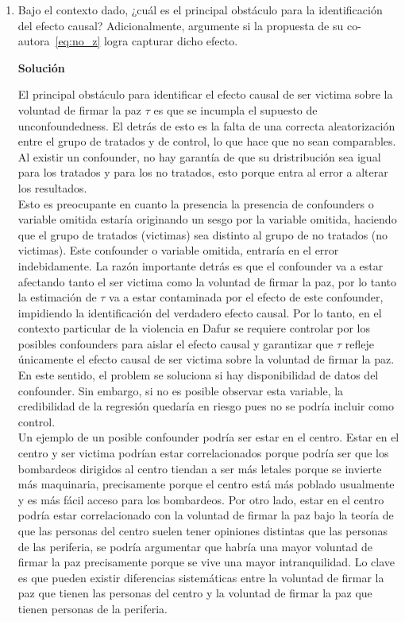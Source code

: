 \documentclass[a4paper, answers, addpoints, 11pt]{exam}
\newenvironment{solucion}{%
  \begin{mdframed}[
    backgroundcolor=blue!5,    %
    linecolor=blue!50,          %
    linewidth=2pt,              %
    leftmargin=10pt,            %
    rightmargin=10pt,           %
    topline=true,              %
    bottomline=true,            %
    roundcorner=10pt,           %
    innerleftmargin=10pt,       %
    innerrightmargin=10pt,      %
    innerbottommargin=10pt,     %
    innertopmargin=10pt         %
  ]%
  \begin{tcolorbox}[colframe=blue!50!black, colback=blue!50, coltitle=white, sharp corners=all, boxrule=1mm, width=\textwidth, halign=left, valign=center, top=0mm, bottom=0mm, left=0mm, right=0mm] \textbf{Solución} \end{tcolorbox} }{\end{mdframed}}
\begin{document}
\begin{enumerate}
    \item Bajo el contexto dado, ¿cuál es el principal obstáculo para la identificación del efecto causal? Adicionalmente, argumente si la propuesta de su co-autora~\eqref{eq:no_z} logra capturar dicho efecto.
    \begin{solucion}
        
        El principal obstáculo para identificar el efecto causal de ser victima sobre la voluntad de firmar la paz $\tau$ es que se incumpla el supuesto de unconfoundedness. El detrás de esto es la falta de una correcta aleatorización entre el grupo de tratados y de control, lo que hace que no sean comparables. Al existir un confounder, no hay garantía de que su dristribución sea igual para los tratados y para los no tratados, esto porque entra al error a alterar los resultados.\\
        
        
        Esto es preocupante en cuanto la presencia la presencia de confounders o variable omitida estaría originando un sesgo por la variable omitida, haciendo que el grupo de tratados (victimas) sea distinto al grupo de no tratados (no victimas). Este confounder o variable omitida, entraría en el error indebidamente. La razón importante detrás es que el confounder va a estar afectando tanto el ser victima como la voluntad de firmar la paz, por lo tanto la estimación de $\tau$ va a estar contaminada por el efecto de este confounder, impidiendo la identificación del verdadero efecto causal. Por lo tanto, en el contexto particular de la violencia en Dafur se requiere controlar por los posibles confounders para aislar el efecto causal y garantizar que $\tau$ refleje únicamente el efecto causal de ser victima sobre la voluntad de firmar la paz.  En este sentido, el problem se soluciona si hay disponibilidad de datos del confounder. Sin embargo, si no es posible observar esta variable, la credibilidad de la regresión quedaría en riesgo pues no se podría incluir como control.\\

        Un ejemplo de un posible confounder podría ser estar en el centro. Estar en el centro y ser victima podrían estar correlacionados porque podría ser que los bombardeos dirigidos al centro tiendan a ser más letales porque se invierte más maquinaria, precisamente porque el centro está más poblado usualmente y es más fácil acceso para los bombardeos. Por otro lado, estar en el centro podría estar correlacionado con la voluntad de firmar la paz bajo la teoría de que las personas del centro suelen tener opiniones distintas que las personas de las periferia, se podría argumentar que habría una mayor voluntad de firmar la paz precisamente porque se vive una mayor intranquilidad. Lo clave es que pueden existir diferencias sistemáticas entre la voluntad de firmar la paz que tienen las personas del centro y la voluntad de firmar la paz que tienen personas de la periferia.\\


\end{solucion}
\end{enumerate}
\end{document}
